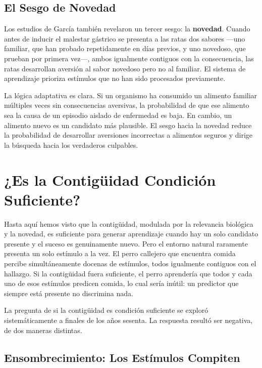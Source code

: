 \documentclass[
  letterpaper,
  DIV=11,
  numbers=noendperiod]{scrreprt}
\begin{document}
\begin{tcolorbox}[enhanced jigsaw, toprule=.15mm, arc=.35mm, colback=white, opacityback=0, colframe=quarto-callout-note-color-frame, breakable, rightrule=.15mm, left=2mm, leftrule=.75mm, bottomrule=.15mm]
\subsection{El Sesgo de Novedad}\label{el-sesgo-de-novedad}

Los estudios de García también revelaron un tercer sesgo: la
\textbf{novedad}. Cuando antes de inducir el malestar gástrico se
presenta a las ratas dos sabores ---uno familiar, que han probado
repetidamente en días previos, y uno novedoso, que prueban por primera
vez---, ambos igualmente contiguos con la consecuencia, las ratas
desarrollan aversión al sabor novedoso pero no al familiar. El sistema
de aprendizaje prioriza estímulos que no han sido procesados
previamente.

La lógica adaptativa es clara. Si un organismo ha consumido un alimento
familiar múltiples veces sin consecuencias aversivas, la probabilidad de
que ese alimento sea la causa de un episodio aislado de enfermedad es
baja. En cambio, un alimento nuevo es un candidato más plausible. El
sesgo hacia la novedad reduce la probabilidad de desarrollar aversiones
incorrectas a alimentos seguros y dirige la búsqueda hacia los
verdaderos culpables.

\section{¿Es la Contigüidad Condición
Suficiente?}\label{es-la-contiguxfcidad-condiciuxf3n-suficiente}

Hasta aquí hemos visto que la contigüidad, modulada por la relevancia
biológica y la novedad, es suficiente para generar aprendizaje cuando
hay un solo candidato presente y el suceso es genuinamente nuevo. Pero
el entorno natural raramente presenta un solo estímulo a la vez. El
perro callejero que encuentra comida percibe simultáneamente docenas de
estímulos, todos igualmente contiguos con el hallazgo. Si la contigüidad
fuera suficiente, el perro aprendería que todos y cada uno de esos
estímulos predicen comida, lo cual sería inútil: un predictor que
siempre está presente no discrimina nada.

La pregunta de si la contigüidad es condición suficiente se exploró
sistemáticamente a finales de los años sesenta. La respuesta resultó ser
negativa, de dos maneras distintas.

\subsection{Ensombrecimiento: Los Estímulos
Compiten}\label{ensombrecimiento-los-estuxedmulos-compiten}


\end{tcolorbox}
\end{document}
